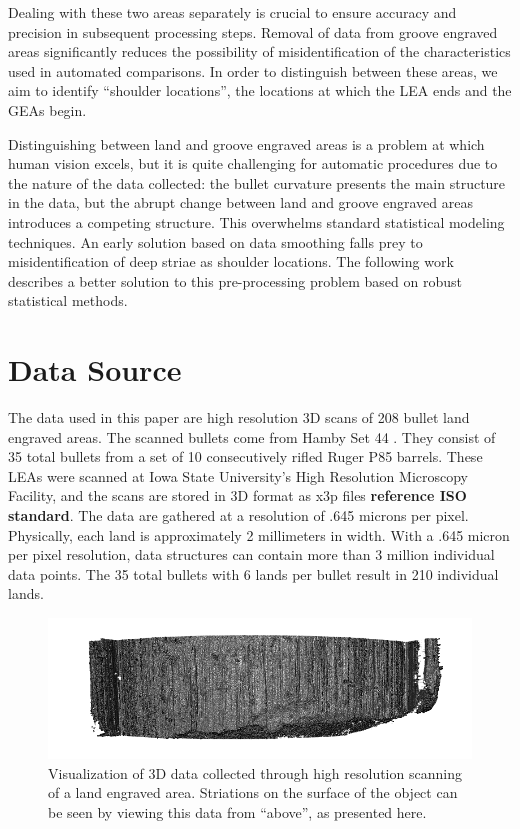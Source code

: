 \documentclass[12pt]{article}
\begin{document}
Dealing with these two areas separately is crucial to ensure accuracy
and precision in subsequent processing steps. Removal of data from
groove engraved areas significantly reduces the possibility of
misidentification of the characteristics used in automated comparisons.
In order to distinguish between these areas, we aim to identify
``shoulder locations'', the locations at which the LEA ends and the GEAs
begin.

Distinguishing between land and groove engraved areas is a problem at
which human vision excels, but it is quite challenging for automatic
procedures due to the nature of the data collected: the bullet curvature
presents the main structure in the data, but the abrupt change between
land and groove engraved areas introduces a competing structure. This
overwhelms standard statistical modeling techniques. An early solution
based on data smoothing falls prey to misidentification of deep striae
as shoulder locations. The following work describes a better solution to
this pre-processing problem based on robust statistical methods.

\section{Data Source}

The data used in this paper are high resolution 3D scans of 208 bullet
land engraved areas. The scanned bullets come from Hamby Set 44
\citep{Hamby}. They consist of 35 total bullets from a set of 10
consecutively rifled Ruger P85 barrels. These LEAs were scanned at Iowa
State University's High Resolution Microscopy Facility, and the scans
are stored in 3D format as x3p files \textbf{reference ISO standard}.
The data are gathered at a resolution of .645 microns per pixel.
Physically, each land is approximately 2 millimeters in width. With a
.645 micron per pixel resolution, data structures can contain more than
3 million individual data points. The 35 total bullets with 6 lands per
bullet result in 210 individual lands.

\begin{figure}[htbp]
\centering
\includegraphics[width=6.25000in]{./images/3d_plot_top.png}
\caption{Visualization of 3D data collected through high resolution
scanning of a land engraved area. Striations on the surface of the
object can be seen by viewing this data from ``above'', as presented
here.}
\end{figure}
\end{document}
